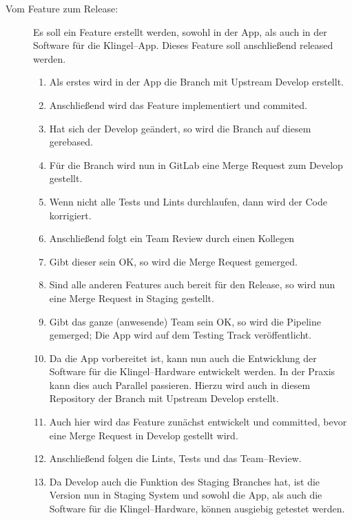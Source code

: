     \begin{description}
        \item[Vom Feature zum Release:] Es soll ein Feature  erstellt werden, sowohl in der App, als auch in der Software für die Klingel--App.
            Dieses Feature soll anschließend released werden.
            \begin{enumerate}
                \item Als erstes wird in der App die Branch  mit Upstream Develop erstellt.
                \item Anschließend wird das Feature implementiert und commited.
                \item Hat sich der Develop geändert, so wird die Branch auf diesem gerebased.
                \item Für die Branch wird nun in GitLab eine Merge Request zum Develop gestellt.
                \item Wenn nicht alle Tests und Lints durchlaufen, dann wird der Code korrigiert.
                \item Anschließend folgt ein Team Review durch einen Kollegen
                \item Gibt dieser sein OK, so wird die Merge Request gemerged.
                \item Sind alle anderen Features auch bereit für den Release, so wird nun eine Merge Request in Staging gestellt.
                \item Gibt das ganze (anwesende) Team sein OK, so wird die Pipeline gemerged;
                    Die App wird auf dem Testing Track veröffentlicht.
                \item Da die App vorbereitet ist, kann nun auch die Entwicklung der Software für die Klingel--Hardware entwickelt werden.
                    In der Praxis kann dies auch Parallel passieren.
                    Hierzu wird auch in diesem Repository der Branch  mit Upstream Develop erstellt.
                \item Auch hier wird das Feature zunächst entwickelt und committed, bevor eine Merge Request in Develop gestellt wird.
                \item Anschließend folgen die Lints, Tests und das Team--Review.
                \item Da Develop auch die Funktion des Staging Branches hat, ist die Version nun in Staging System und sowohl die App, als auch die Software für die Klingel--Hardware, können ausgiebig getestet werden.

\end{enumerate}
\end{description}
